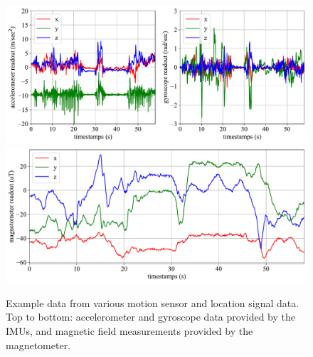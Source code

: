 \begin{figure}[t]
    \centering
    \includegraphics[width=\linewidth]{images/sampledata/imu.pdf}
    \includegraphics[width=\linewidth]{images/sampledata/mag.pdf}
    \caption{Example data from various motion sensor and location signal data. Top to bottom: accelerometer and gyroscope data provided by the IMUs, and magnetic field measurements provided by the magnetometer.}
    \label{fig:aria-multi-modal-data-imu-mag-baro}
\end{figure}

